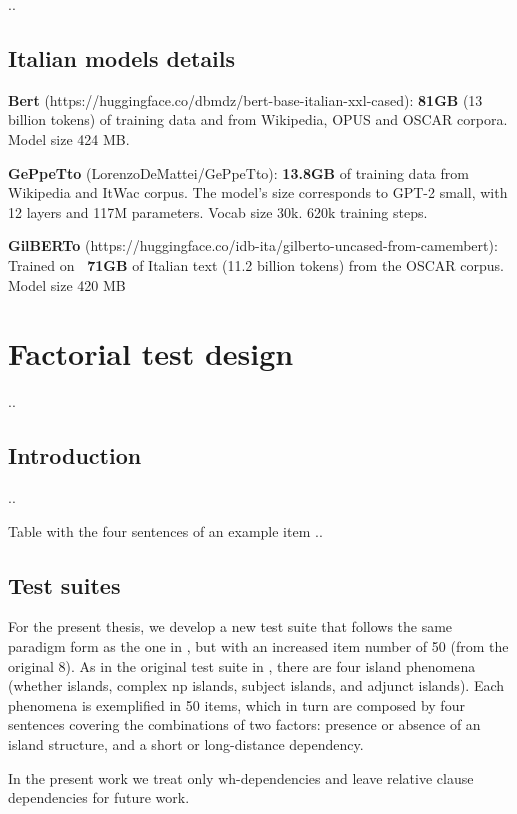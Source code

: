 ..


\subsection{Italian models details}

\textbf{Bert} (https://huggingface.co/dbmdz/bert-base-italian-xxl-cased): \textbf{81GB} (13 billion tokens) of training data  and from Wikipedia, OPUS and OSCAR corpora. Model size 424 MB.

\textbf{GePpeTto} (LorenzoDeMattei/GePpeTto): \textbf{13.8GB} of training data from Wikipedia and ItWac corpus. The model’s size corresponds to GPT-2 small, with 12 layers and 117M parameters. Vocab size 30k. 620k training steps.

\textbf{GilBERTo} (https://huggingface.co/idb-ita/gilberto-uncased-from-camembert): Trained on \textbf{~71GB} of Italian text (11.2 billion tokens) from the OSCAR corpus. Model size 420 MB


\section{Factorial test design}

..

\subsection{Introduction}

..

Table with the four sentences of an example item ..

\subsection{Test suites}

For the present thesis, we develop a new test suite that follows the same paradigm form as the one in \citet{sprouse2016experimental}, but with an increased item number of 50 (from the original 8). As in the original test suite in \citet{sprouse2016experimental}, there are four island phenomena (whether islands, complex np islands, subject islands, and adjunct islands). Each phenomena is exemplified in 50 items, which in turn are composed by four sentences covering the combinations of two factors: presence or absence of an island structure, and a short or long-distance dependency.

In the present work we treat only wh-dependencies and leave relative clause dependencies for future work.

